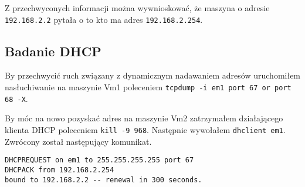 \documentclass{mwart} %
\begin{document}
Z przechwyconych informacji można wywnioskować, że maszyna o adresie \texttt{192.168.2.2} pytała o to kto ma adres \texttt{192.168.2.254}.

\subsection{Badanie DHCP}
By przechwycić ruch związany z dynamicznym nadawaniem adresów uruchomiłem nasłuchiwanie na maszynie Vm1 poleceniem \texttt{tcpdump -i em1 port 67 or port 68 -X}.

By móc na nowo pozyskać adres na maszynie Vm2 zatrzymałem działającego klienta DHCP poleceniem \texttt{kill -9 968}. Następnie wywołałem \texttt{dhclient em1}. Zwrócony został następujący komunikat.
\begin{verbatim}
DHCPREQUEST on em1 to 255.255.255.255 port 67
DHCPACK from 192.168.2.254
bound to 192.168.2.2 -- renewal in 300 seconds.
\end{verbatim}
\end{document}

